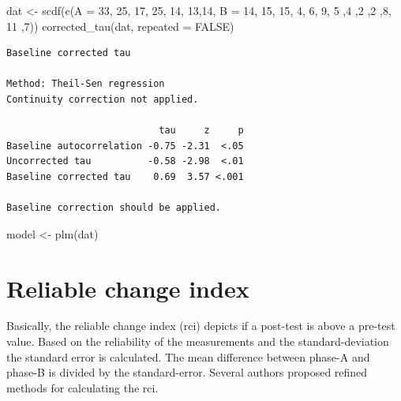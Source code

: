 \documentclass[
]{book}
\newenvironment{Shaded}{\begin{snugshade}}{\end{snugshade}}
\newcommand{\AttributeTok}[1]{\textcolor[rgb]{0.77,0.63,0.00}{#1}}
\newcommand{\ConstantTok}[1]{\textcolor[rgb]{0.00,0.00,0.00}{#1}}
\newcommand{\DecValTok}[1]{\textcolor[rgb]{0.00,0.00,0.81}{#1}}
\newcommand{\FunctionTok}[1]{\textcolor[rgb]{0.00,0.00,0.00}{#1}}
\newcommand{\NormalTok}[1]{#1}
\newcommand{\OtherTok}[1]{\textcolor[rgb]{0.56,0.35,0.01}{#1}}
\begin{document}
\begin{Shaded}
\begin{Highlighting}[]
\NormalTok{dat }\OtherTok{\textless{}{-}} \FunctionTok{scdf}\NormalTok{(}\FunctionTok{c}\NormalTok{(}\AttributeTok{A =} \DecValTok{33}\NormalTok{, }\DecValTok{25}\NormalTok{, }\DecValTok{17}\NormalTok{, }\DecValTok{25}\NormalTok{, }\DecValTok{14}\NormalTok{, }\DecValTok{13}\NormalTok{,}\DecValTok{14}\NormalTok{, }\AttributeTok{B =} \DecValTok{14}\NormalTok{, }\DecValTok{15}\NormalTok{, }\DecValTok{15}\NormalTok{, }\DecValTok{4}\NormalTok{, }\DecValTok{6}\NormalTok{, }\DecValTok{9}\NormalTok{, }\DecValTok{5}\NormalTok{ ,}\DecValTok{4}\NormalTok{ ,}\DecValTok{2}\NormalTok{ ,}\DecValTok{2}\NormalTok{ ,}\DecValTok{8}\NormalTok{, }\DecValTok{11}\NormalTok{ ,}\DecValTok{7}\NormalTok{))}
\FunctionTok{corrected\_tau}\NormalTok{(dat, }\AttributeTok{repeated =} \ConstantTok{FALSE}\NormalTok{)}
\end{Highlighting}
\end{Shaded}

\begin{verbatim}
Baseline corrected tau

Method: Theil-Sen regression
Continuity correction not applied.

                           tau     z     p
Baseline autocorrelation -0.75 -2.31  <.05
Uncorrected tau          -0.58 -2.98  <.01
Baseline corrected tau    0.69  3.57 <.001

Baseline correction should be applied.
\end{verbatim}

\begin{Shaded}
\begin{Highlighting}[]
\NormalTok{model }\OtherTok{\textless{}{-}} \FunctionTok{plm}\NormalTok{(dat)}
\end{Highlighting}
\end{Shaded}

\hypertarget{reliable-change-index}{%
\section{Reliable change index}\label{reliable-change-index}}

Basically, the reliable change index (rci) depicts if a post-test is above a pre-test value. Based on the reliability of the measurements and the standard-deviation the standard error is calculated. The mean difference between phase-A and phase-B is divided by the standard-error. Several authors proposed refined methods for calculating the rci.
\end{document}
